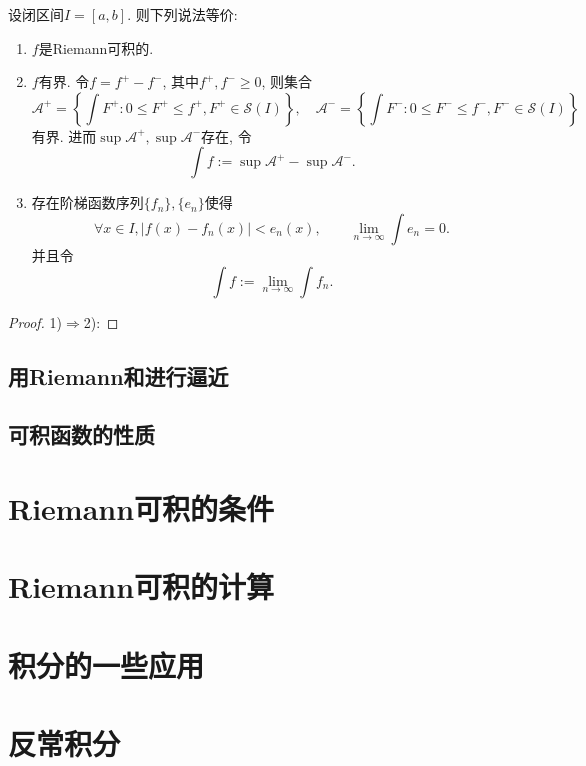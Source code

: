\begin{proposition}{}
	设闭区间$I=[a,b]$. 则下列说法等价: 
	\begin{enumerate}
		\item $f$是Riemann可积的.
		\item $f$有界. 令$f=f^+-f^-$, 其中$f^+ ,f^- \geq 0$, 则集合$$\mathcal{A}^+ = \left\{ \int F^+:0\leq F^+ \leq f^+, F^+ \in \mathcal{S}(I)  \right\},\quad \mathcal{A}^- = \left\{ \int F^-:0\leq F^- \leq f^-, F^- \in \mathcal{S}(I)  \right\}$$
		有界. 进而$\sup \mathcal{A}^+, \sup \mathcal{A}^-$存在, 令$$\int f := \sup \mathcal{A}^+- \sup \mathcal{A}^-.$$
		\item 存在阶梯函数序列$\{ f_n \},\{ e_n \}$使得$$\forall x \in I,|f(x)-f_n(x)|<e_n(x),\qquad \lim_{n\to \infty} \int e_n = 0.$$
		并且令$$\int f := \lim_{n\to \infty} \int f_n .$$
	\end{enumerate}
\end{proposition}
\begin{proof}
	1)$\Rightarrow$2): 
\end{proof}





\subsection{用Riemann和进行逼近}





\subsection{可积函数的性质}





\newpage
\section{Riemann可积的条件}







\newpage
\section{Riemann可积的计算}







\newpage
\section{积分的一些应用}








\newpage
\section{反常积分}